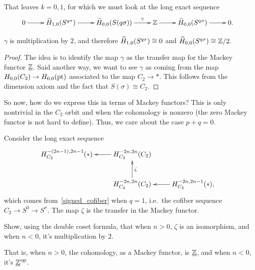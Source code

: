 That leaves $k = 0,1$, for which we must look at the long exact sequence
\[\xymatrix{
	0\ar[r] & \wH_{1,0}(S^{q\sigma})\ar[r] & \wH_{0,0}(S(q\sigma))\ar[r]^-\gamma &\Z\ar[r] &
	\wH_{0,0}(S^{q\sigma})\ar[r] & 0.
}\]
\begin{claim}
$\gamma$ is multiplication by $2$, and therefore $\widetilde H_{1,0}(S^{q\sigma})\cong 0$ and
$\widetilde H_{0,0}(S^{q\sigma})\cong\mathbb Z/2$.
\end{claim}
\begin{proof}
The idea is to identify the map $\gamma$ as the transfer map for the Mackey functor
$\underline{\mathbb Z}$. Said another way, we want to see $\gamma$ as coming from the map $H_{0,0}(C_2)\to H_{0,0}(\mathrm{pt})$
associated to the map $C_2\to *$. This follows from the dimension axiom and the fact that $S(\sigma)\cong C_2$.
\end{proof}
So now, how do we express this in terms of Mackey functors? This is only nontrivial in the $C_2$ orbit and when the
cohomology is nonzero (the zero Mackey functor is not hard to define). Thus, we care about the case $p+q = 0$.

Consider the long exact sequence
\[\xymatrix{
	H_{C_2}^{-(2n-1), 2n-1}(*) & H_{C_2}^{-2n,2n}(C_2)\ar[l]\\
	& H_{C_2}^{-2n,2n}(C_2)\ar[u]_\zeta & H_{C_2}^{-2n,2n-1}(*),\ar[l]
}\]
which comes from~\eqref{signed_cofiber} when $q = 1$, i.e.\ the cofiber sequence $C_2\to S^0\to S^\sigma$. The map
$\zeta$ is the transfer in the Mackey functor.
\begin{ex}
Show, using the double coset formula, that when $n > 0$, $\zeta$ is an isomorphism, and when $n < 0$, it's
multiplication by $2$.
\end{ex}
That is, when $n > 0$, the cohomology, as a Mackey functor, is $\underline{\mathbb Z}$, and when $n < 0$, it's
$\underline{\mathbb Z}^{\mathrm{op}}$.
